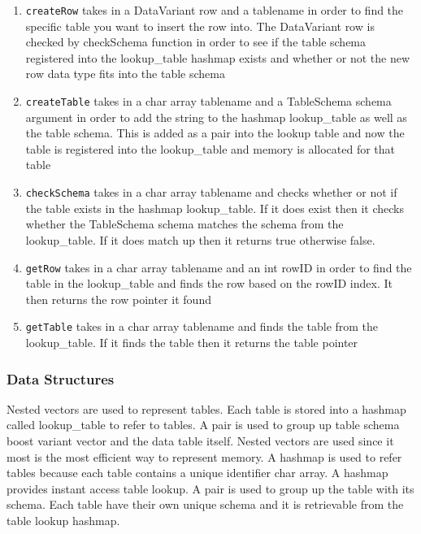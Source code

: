 \documentclass[letterpaper, 12pt]{article}
\newcommand{\inlinecode}[1]{\colorbox{codegrey}{\lstinline[language=C++]{#1}}}
\begin{document}
	\begin{enumerate}
		\item \inlinecode{createRow} takes in a DataVariant row and a tablename in order to find the specific table
		you want to insert the row into. The DataVariant row is checked by checkSchema function in
		order to see if the table schema registered into the lookup\_table hashmap exists and whether
		or not the new row data type fits into the table schema
		\item \inlinecode{createTable} takes in a char array tablename and a TableSchema schema argument in order to add
		the string to the hashmap lookup{\_}table as well as the table schema. This is added as a pair
		into the lookup table and now the table is registered into the lookup{\_}table and memory is allocated
		for that table
		\item \inlinecode{checkSchema} takes in a char array tablename and checks whether or not if the table exists in the
		hashmap lookup{\_}table. If it does exist then it checks whether the TableSchema schema matches the
		schema from the lookup{\_}table. If it does match up then it returns true otherwise false.
		\item \inlinecode{getRow} takes in a char array tablename and an int rowID in order to find the table in the lookup{\_}table
		and finds the row based on the rowID index. It then returns the row pointer it found
		\item \inlinecode{getTable} takes in a char array tablename and finds the table from the lookup\_table. If it finds the table
		then it returns the table pointer
	\end{enumerate}

\subsubsection{Data Structures}
	Nested vectors are used to represent tables. Each table is stored into a hashmap called lookup{\_}table to refer to
	tables. A pair is used to group up table schema boost variant vector and the data table itself. Nested vectors
	are used since it most is the most efficient way to represent memory. A hashmap is used to refer tables because each
	table contains a unique identifier char array. A hashmap provides instant access table lookup. A pair is used to group
	up the table with its schema. Each table have their own unique schema and it is retrievable from the table lookup hashmap.
\end{document}
